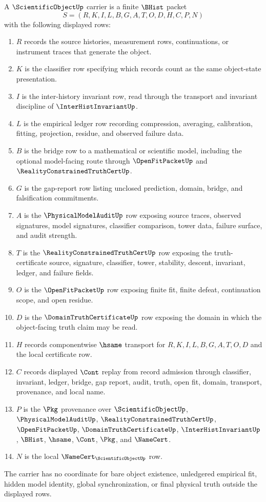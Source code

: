 \begin{definition}
\label{def:scientific-object-carrier}
A $\ScientificObjectUp$ carrier is a finite $\BHist$ packet
$$
S=(R,K,I,L,B,G,A,T,O,D,H,C,P,N)
$$
with the following displayed rows:
\begin{enumerate}
\item $R$ records the source histories, measurement rows, continuations, or instrument traces that generate the object.
\item $K$ is the classifier row specifying which records count as the same object-state presentation.
\item $I$ is the inter-history invariant row, read through the transport and invariant discipline of $\InterHistInvariantUp$.
\item $L$ is the empirical ledger row recording compression, averaging, calibration, fitting, projection, residue, and observed failure data.
\item $B$ is the bridge row to a mathematical or scientific model, including the optional model-facing route through $\OpenFitPacketUp$ and $\RealityConstrainedTruthCertUp$.
\item $G$ is the gap-report row listing unclosed prediction, domain, bridge, and falsification commitments.
\item $A$ is the $\PhysicalModelAuditUp$ row exposing source traces, observed signatures, model signatures, classifier comparison, tower data, failure surface, and audit strength.
\item $T$ is the $\RealityConstrainedTruthCertUp$ row exposing the truth-certificate source, signature, classifier, tower, stability, descent, invariant, ledger, and failure fields.
\item $O$ is the $\OpenFitPacketUp$ row exposing finite fit, finite defeat, continuation scope, and open residue.
\item $D$ is the $\DomainTruthCertificateUp$ row exposing the domain in which the object-facing truth claim may be read.
\item $H$ records componentwise $\hsame$ transport for $R,K,I,L,B,G,A,T,O,D$ and the local certificate row.
\item $C$ records displayed $\Cont$ replay from record admission through classifier, invariant, ledger, bridge, gap report, audit, truth, open fit, domain, transport, provenance, and local name.
\item $P$ is the $\Pkg$ provenance over $\ScientificObjectUp$, $\PhysicalModelAuditUp$, $\RealityConstrainedTruthCertUp$, $\OpenFitPacketUp$, $\DomainTruthCertificateUp$, $\InterHistInvariantUp$, $\BHist$, $\hsame$, $\Cont$, $\Pkg$, and $\NameCert$.
\item $N$ is the local $\NameCert_{\ScientificObjectUp}$ row.
\end{enumerate}
The carrier has no coordinate for bare object existence, unledgered empirical fit, hidden model identity, global synchronization, or final physical truth outside the displayed rows.
\end{definition}

